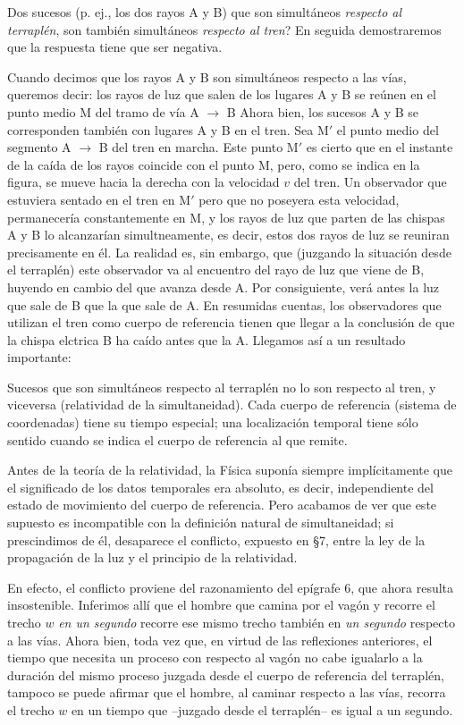 \documentclass[spanish]{book}
\begin{document}
Dos sucesos (p. ej., los dos rayos A y B) que son simultáneos \textit{respecto al terraplén},
son también simultáneos \textit{respecto al tren}? En seguida demostraremos que la respuesta
tiene que ser negativa.

Cuando decimos que los rayos A y B son simultáneos respecto a las vías, queremos
decir: los rayos de luz que salen de los lugares A y B se reúnen en el punto medio
M del tramo de vía A $\longrightarrow$ B Ahora bien, los sucesos A y B se corresponden también con
lugares A y B en el tren. Sea M$'$ el punto medio del segmento A $\longrightarrow$ B
del tren en marcha. Este punto M$'$ es cierto que en el instante de la caída de los rayos coincide
con el punto M, pero, como se indica en la figura, se mueve hacia la derecha con la
velocidad $v$ del tren. Un observador que estuviera sentado en el tren en M$'$ pero que no
poseyera esta velocidad, permanecería constantemente en M, y los rayos de luz que
parten de las chispas A y B lo alcanzarían simultneamente, es decir, estos dos rayos
de luz se reuniran precisamente en él. La realidad es, sin embargo, que (juzgando la
situación desde el terraplén) este observador va al encuentro del rayo de luz que
viene de B, huyendo en cambio del que avanza desde A. Por consiguiente, verá antes
la luz que sale de B que la que sale de A. En resumidas cuentas, los observadores
que utilizan el tren como cuerpo de referencia tienen que llegar a la conclusión de
que la chispa elctrica B ha caído antes que la A. Llegamos así a un resultado
importante:

Sucesos que son simultáneos respecto al terraplén no lo son respecto al tren, y
viceversa (relatividad de la simultaneidad). Cada cuerpo de referencia (sistema de
coordenadas) tiene su tiempo especial; una localización temporal tiene sólo sentido
cuando se indica el cuerpo de referencia al que remite.

Antes de la teoría de la relatividad, la Física suponía siempre implícitamente que el
significado de los datos temporales era absoluto, es decir, independiente del estado de
movimiento del cuerpo de referencia. Pero acabamos de ver que este supuesto es
incompatible con la definición natural de simultaneidad; si prescindimos de él,
desaparece el conflicto, expuesto en \S 7, entre la ley de la propagación de la luz y el
principio de la relatividad.

En efecto, el conflicto proviene del razonamiento del epígrafe 6, que ahora resulta
insostenible. Inferimos allí que el hombre que camina por el vagón y recorre el trecho $w$
\textit{en un segundo} recorre ese mismo trecho también en \textit{un segundo}
respecto a las vías. Ahora bien, toda vez que, en virtud de las reflexiones anteriores, el tiempo que
necesita un proceso con respecto al vagón no cabe igualarlo a la duración del mismo
proceso juzgada desde el cuerpo de referencia del terraplén, tampoco se puede
afirmar que el hombre, al caminar respecto a las vías, recorra el trecho $w$ 
en un tiempo que --juzgado desde el terraplén-- es igual a un segundo. 
\end{document}
